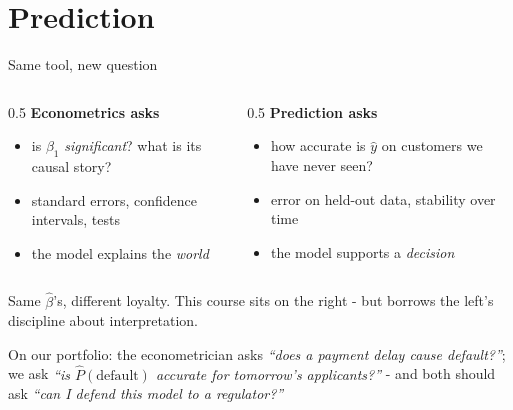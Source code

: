\documentclass[10pt,aspectratio=169]{beamer}
\begin{document}
\section{Prediction}

\begin{frame}{Same tool, new question}
  \begin{columns}[T]
    \begin{column}{0.5\textwidth}
      \textbf{Econometrics asks}
      \begin{itemize}\small
        \item is $\beta_1$ \emph{significant}? what is its causal story?
        \item standard errors, confidence intervals, tests
        \item the model explains the \emph{world}
      \end{itemize}
    \end{column}
    \begin{column}{0.5\textwidth}
      \textbf{Prediction asks}
      \begin{itemize}\small
        \item how accurate is $\hat{y}$ on \alert{customers we have never seen}?
        \item error on held-out data, stability over time
        \item the model supports a \emph{decision}
      \end{itemize}
    \end{column}
  \end{columns}
  \vspace{0.8em}
  \begin{center}
    Same $\hat\beta$'s, different loyalty. This course sits on the right -
    but borrows the left's discipline about interpretation.
  \end{center}
  \vspace{0.6em}
  \begin{center}\small
    On our portfolio: the econometrician asks \emph{``does a payment delay
    cause default?''}; we ask \emph{``is $\hat{P}(\text{default})$ accurate
    for tomorrow's applicants?''} - and both should ask \emph{``can I
    defend this model to a regulator?''}
  \end{center}
\end{frame}
\end{document}

